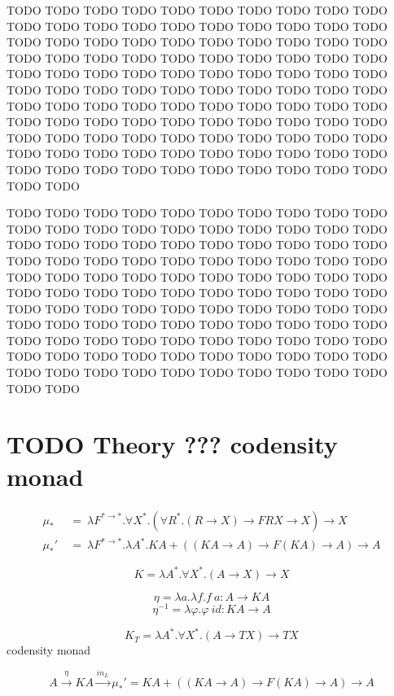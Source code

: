 \documentclass[a4paper,UKenglish]{lipics}
\newcommand{\inL}[0]{\textit{in}_{L}}
\begin{document}
TODO TODO TODO TODO TODO TODO TODO TODO TODO TODO TODO TODO TODO TODO
TODO TODO TODO TODO TODO TODO TODO TODO TODO TODO TODO TODO TODO TODO
TODO TODO TODO TODO TODO TODO TODO TODO TODO TODO TODO TODO TODO TODO
TODO TODO TODO TODO TODO TODO TODO TODO TODO TODO TODO TODO TODO TODO
TODO TODO TODO TODO TODO TODO TODO TODO TODO TODO TODO TODO TODO TODO
TODO TODO TODO TODO TODO TODO TODO TODO TODO TODO TODO TODO TODO TODO
TODO TODO TODO TODO TODO TODO TODO TODO TODO TODO TODO TODO TODO TODO
TODO TODO TODO TODO TODO TODO TODO TODO TODO TODO TODO TODO TODO TODO


\begin{figure}

\vspace*{-3ex}
\end{figure}

TODO TODO TODO TODO TODO TODO TODO TODO TODO TODO TODO TODO TODO TODO
TODO TODO TODO TODO TODO TODO TODO TODO TODO TODO TODO TODO TODO TODO
TODO TODO TODO TODO TODO TODO TODO TODO TODO TODO TODO TODO TODO TODO
TODO TODO TODO TODO TODO TODO TODO TODO TODO TODO TODO TODO TODO TODO
TODO TODO TODO TODO TODO TODO TODO TODO TODO TODO TODO TODO TODO TODO
TODO TODO TODO TODO TODO TODO TODO TODO TODO TODO TODO TODO TODO TODO
TODO TODO TODO TODO TODO TODO TODO TODO TODO TODO TODO TODO TODO TODO
TODO TODO TODO TODO TODO TODO TODO TODO TODO TODO TODO TODO TODO TODO



\section{TODO Theory ??? codensity monad}
\begin{align*}
\mu_{*} &~=~ \lambda F^{* \to *}.\forall X^{*}.
		(\forall R^{*}.(R \to X) \to F R X \to X) \to X
	\\
\mu_{*}'&~=~ \lambda F^{* \to *}.\lambda A^{*}.
		K A + ((K A \to A) \to F(K A) \to A) \to A
\end{align*}

\[K = \lambda A^{*}.\forall X^{*}.(A \to X) \to X \]

\[ \eta = \lambda a.\lambda f.f~a : A \to KA \]
\[\eta^{-1} = \lambda \varphi.\varphi~\textit{id} : KA \to A\]


\[K_T = \lambda A^{*}.\forall X^{*}.(A \to T X) \to T X \] codensity monad


\[ A \xrightarrow{\eta} KA \xrightarrow{\inL} \mu_{*}' = KA+((KA \to A) \to F(KA) \to A) \to A \]
\end{document}
